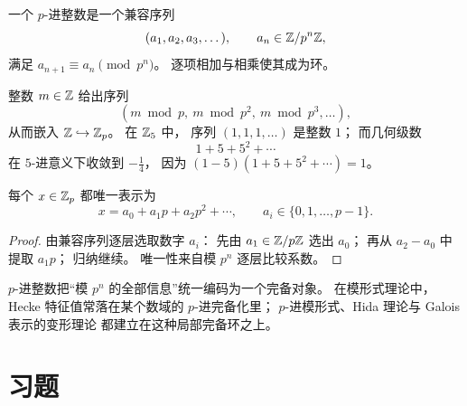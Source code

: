 \begin{definition}
一个 $p$-进整数是一个兼容序列
\[
(a_1,a_2,a_3,\dots),
\qquad a_n\in \mathbb{Z}/p^n\mathbb{Z},
\]
满足 $a_{n+1}\equiv a_n\pmod{p^n}$。
逐项相加与相乘使其成为环。
\end{definition}

\begin{example}
整数 $m\in\mathbb{Z}$ 给出序列
\[
(m\bmod p,\ m\bmod p^2,\ m\bmod p^3,\dots),
\]
从而嵌入 $\mathbb{Z}\hookrightarrow \mathbb{Z}_p$。
在 $\mathbb{Z}_5$ 中，
序列 $(1,1,1,\dots)$ 是整数 $1$；
而几何级数
\[
1+5+5^2+\cdots
\]
在 $5$-进意义下收敛到 $-\frac14$，
因为 $(1-5)(1+5+5^2+\cdots)=1$。
\end{example}

\begin{proposition}
每个 $x\in \mathbb{Z}_p$ 都唯一表示为
\[
x=a_0+a_1p+a_2p^2+\cdots,
\qquad a_i\in\{0,1,\dots,p-1\}.
\]
\end{proposition}

\begin{proof}
由兼容序列逐层选取数字 $a_i$：
先由 $a_1\in \mathbb{Z}/p\mathbb{Z}$ 选出 $a_0$；
再从 $a_2-a_0$ 中提取 $a_1p$；
归纳继续。
唯一性来自模 $p^n$ 逐层比较系数。
\end{proof}

\begin{remark}
$p$-进整数把“模 $p^n$ 的全部信息”统一编码为一个完备对象。
在模形式理论中，
Hecke 特征值常落在某个数域的 $p$-进完备化里；
$p$-进模形式、Hida 理论与 Galois 表示的变形理论
都建立在这种局部完备环之上。
\end{remark}

\section*{习题}

